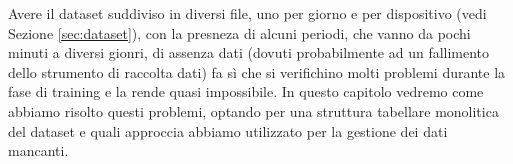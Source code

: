 Avere il dataset suddiviso in diversi file, uno per giorno e per
dispositivo (vedi Sezione \ref{sec:dataset}), con la presneza di
alcuni periodi, che vanno da pochi minuti a diversi gionri, di assenza dati
(dovuti probabilmente ad un fallimento dello strumento di raccolta dati)
fa sì che si verifichino molti problemi durante la fase di training
e la rende quasi impossibile. In questo capitolo vedremo come abbiamo
risolto questi problemi, optando per una struttura tabellare monolitica
del dataset e quali approccia abbiamo utilizzato per la gestione
dei dati mancanti.
